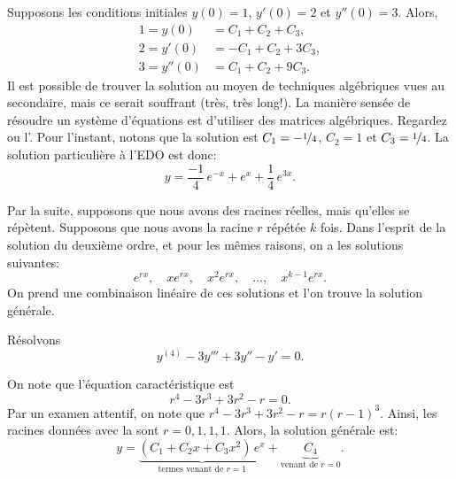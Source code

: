 \begin{example}
	Supposons les conditions initiales $y(0) = 1$, $y'(0) = 2$ et $y''(0) = 3$.  
	Alors,
	\begin{align*}
		1 = y(0) & = C_1 + C_2 + C_3 , \\
		2 = y'(0) & = -C_1 + C_2 + 3C_3 , \\
		3 = y''(0) & = C_1 + C_2 + 9C_3 .
	\end{align*}
	Il est possible de trouver la solution au moyen de techniques algébriques vues au secondaire, mais ce serait souffrant (très, très long!). La manière sensée de résoudre un système d'équations est d'utiliser des matrices algébriques. Regardez  ou l'.
	Pour l'instant, notons que la solution est  
	$C_1 = -\nicefrac{1}{4}$, $C_2 = 1$ et $C_3 = \nicefrac{1}{4}$.  
	La solution particulière à l'EDO est donc:
	\begin{equation*}
		y = \frac{-1}{4}\, e^{-x} + e^x + \frac{1}{4}\, e^{3x} .
	\end{equation*}
\end{example}

Par la suite, supposons que nous avons des racines réelles, mais qu'elles se répètent. 
Supposons que nous avons la racine $r$ répétée $k$ fois. 
Dans l'esprit de la solution du deuxième ordre, et pour les mêmes raisons, on a les solutions suivantes: 
\begin{equation*}
	e^{rx}, \quad xe^{rx}, \quad x^2 e^{rx}, \quad \ldots, \quad x^{k-1} e^{rx} .
\end{equation*}
On prend une combinaison linéaire de ces solutions et l'on trouve la solution générale. 
\begin{example}
	Résolvons
	\begin{equation*}
		y^{(4)} - 3 y''' + 3 y'' - y' =  0 .
	\end{equation*}
	
	On note que l'équation caractéristique est 
	\begin{equation*}
		r^4 - 3r^3 + 3r^2 -r = 0 .
	\end{equation*}
	Par un examen attentif, on note que  $r^4 - 3r^3 + 3r^2 -r = r{(r-1)}^3$.  
	Ainsi, les racines données avec la 
	 sont $r = 0, 1, 1, 1$.  
	Alors, la solution générale est: 
	\begin{equation*}
		y = \underbrace{(C_1 + C_2 x + C_3 x^2)\, e^x}_{\text{termes venant de }r=1} 
			+ \underbrace{C_4}_{\text{venant de } r=0} .
	\end{equation*}
\end{example}

